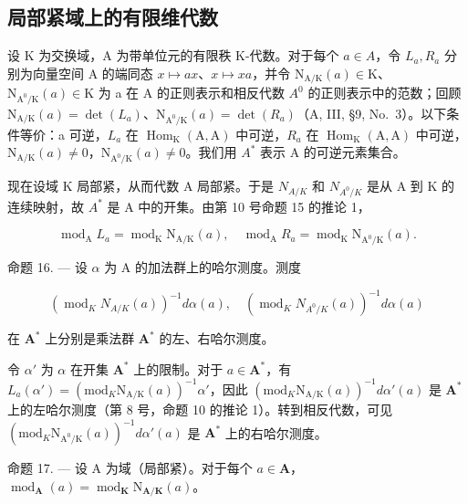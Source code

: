 \subsection{局部紧域上的有限维代数}

设 K 为交换域，A 为带单位元的有限秩 K-代数。对于每个 \(a \in A\)，令 \(L_{a}, R_{a}\) 分别为向量空间 A 的端同态 \(x \mapsto ax\)、\(x \mapsto xa\)，并令 \(\mathrm{N}_{\mathrm{A}/\mathrm{K}}(a) \in \mathrm{K}\)、\(\mathrm{N}_{\mathrm{A}^{0}/\mathrm{K}}(a) \in \mathrm{K}\) 为 a 在 A 的正则表示和相反代数 \(A^{0}\) 的正则表示中的范数；回顾 \(\mathrm{N}_{\mathrm{A}/\mathrm{K}}(a) = \det(L_{a})\)、\(\mathrm{N}_{\mathrm{A}^{0}/\mathrm{K}}(a) = \det(R_{a})\)（A, III, §9, No.~3）。以下条件等价：a 可逆，\(L_{a}\) 在 \(\operatorname{Hom}_{\mathrm{K}}(\mathrm{A}, \mathrm{A})\) 中可逆，\(R_{a}\) 在 \(\operatorname{Hom}_{\mathrm{K}}(\mathrm{A}, \mathrm{A})\) 中可逆，\(\mathrm{N}_{\mathrm{A}/\mathrm{K}}(a) \neq 0\)，\(\mathrm{N}_{\mathrm{A}^{0}/\mathrm{K}}(a) \neq 0\)。我们用 \(A^{*}\) 表示 A 的可逆元素集合。

现在设域 K 局部紧，从而代数 A 局部紧。于是 \(N_{A/K}\) 和 \(N_{A^{0}/K}\) 是从 A 到 K 的连续映射，故 \(A^{*}\) 是 A 中的开集。由第 10 号命题 15 的推论 1，

\[
\operatorname{mod} _ {\mathrm{A}} L _ {a} = \operatorname{mod} _ {\mathrm{K}} \mathrm{N} _ {\mathrm{A} / \mathrm{K}} (a), \quad \operatorname{mod} _ {\mathrm{A}} R _ {a} = \operatorname{mod} _ {\mathrm{K}} \mathrm{N} _ {\mathrm{A} ^ {0} / \mathrm{K}} (a).\tag{38}
\]

命题 16. --- 设 \(\alpha\) 为 A 的加法群上的哈尔测度。测度

\[
\left(\operatorname{mod} _ {K} N _ {A / K} (a)\right) ^ {- 1} d \alpha (a), \quad \left(\operatorname{mod} _ {K} N _ {A ^ {0} / K} (a)\right) ^ {- 1} d \alpha (a)
\]

在 \(\mathbf{A}^*\) 上分别是乘法群 \(\mathbf{A}^*\) 的左、右哈尔测度。

令 \(\alpha'\) 为 \(\alpha\) 在开集 \(\mathbf{A}^*\) 上的限制。对于 \(a \in \mathbf{A}^*\)，有 \(L_a(\alpha') = (\mathrm{mod}_K \mathrm{N}_{\mathrm{A}/\mathrm{K}}(a))^{-1} \alpha'\)，因此 \((\mathrm{mod}_K \mathrm{N}_{\mathrm{A}/\mathrm{K}}(a))^{-1} d\alpha'(a)\) 是 \(\mathbf{A}^*\) 上的左哈尔测度（第 8 号，命题 10 的推论 1）。转到相反代数，可见 \((\mathrm{mod}_K \mathrm{N}_{\mathrm{A}^0/\mathrm{K}}(a))^{-1} d\alpha'(a)\) 是 \(\mathbf{A}^*\) 上的右哈尔测度。

命题 17. --- 设 A 为域（局部紧）。对于每个 \(a \in \mathbf{A}\)，\(\operatorname{mod}_{\mathbf{A}}(a) = \operatorname{mod}_{\mathbf{K}} \mathrm{N}_{\mathbf{A}/\mathbf{K}}(a)\)。

